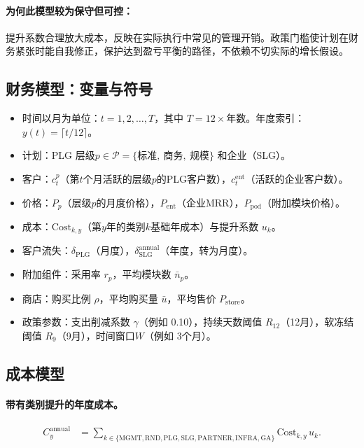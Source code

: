 \documentclass[11点, A4纸, 单面]{article}
\begin{document}
\paragraph{为何此模型较为保守但可控：}
提升系数合理放大成本，反映在实际执行中常见的管理开销。政策门槛使计划在财务紧张时能自我修正，保护达到盈亏平衡的路径，不依赖不切实际的增长假设。

\subsection{财务模型：变量与符号}
\begin{itemize}
  \item 时间以月为单位：$t = 1,2,\dots,T$，其中 $T = 12 \times \text{年数}$。年度索引：$y(t) = \lceil t/12 \rceil$。
  \item 计划：PLG 层级$p \in \mathcal{P}=\{\text{标准},\ \text{商务},\ \text{规模}\}$ 和企业（SLG）。
  \item 客户：$c^p_t$（第$t$个月活跃的层级$p$的PLG客户数），$c^{\mathrm{ent}}_t$（活跃的企业客户数）。
  \item 价格：$P_p$（层级$p$的月度价格），$P_{\mathrm{ent}}$（企业MRR），$P_{\mathrm{pod}}$（附加模块价格）。
  \item 成本：$\mathrm{Cost}_{k,y}$（第$y$年的类别$k$基础年成本）与提升系数 $u_k$。
  \item 客户流失：$\delta_{\mathrm{PLG}}$（月度），$\delta^{\mathrm{annual}}_{\mathrm{SLG}}$（年度，转为月度）。
  \item 附加组件：采用率 $r_p$，平均模块数 $\bar{n}_p$。
  \item 商店：购买比例 $\rho$，平均购买量 $\bar{u}$，平均售价 $P_{\mathrm{store}}$。
  \item 政策参数：支出削减系数 $\gamma$（例如 0.10），持续天数阈值 $R_{12}$（12月），软冻结阈值 $R_{9}$（9月），时间窗口$W$（例如 3个月）。
\end{itemize}

\newpage
\subsection{成本模型}
\paragraph{带有类别提升的年度成本。}
\begin{align}
C^{\mathrm{annual}}_y 
  &= \sum_{k \in \{\mathrm{MGMT},\mathrm{RND},\mathrm{PLG},\mathrm{SLG},\mathrm{PARTNER},\mathrm{INFRA},\mathrm{GA}\}}
     \mathrm{Cost}_{k,y}\, u_k.
\end{align}
\end{document}
